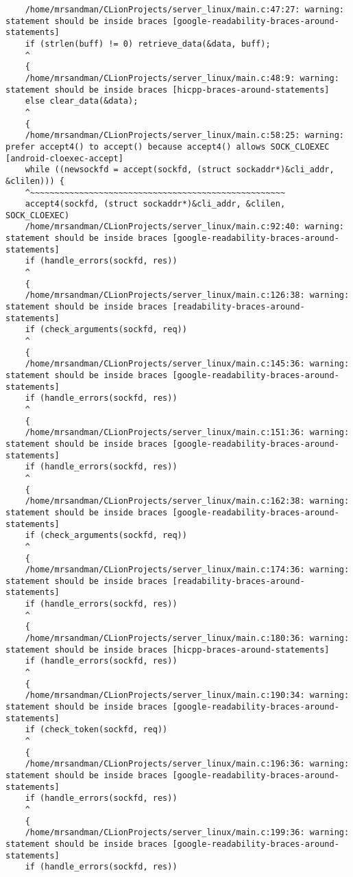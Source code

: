 \begin{itemize}
\begin{lstlisting}
	/home/mrsandman/CLionProjects/server_linux/main.c:47:27: warning: statement should be inside braces [google-readability-braces-around-statements]
	if (strlen(buff) != 0) retrieve_data(&data, buff);
	^
	{
	/home/mrsandman/CLionProjects/server_linux/main.c:48:9: warning: statement should be inside braces [hicpp-braces-around-statements]
	else clear_data(&data);
	^
	{
	/home/mrsandman/CLionProjects/server_linux/main.c:58:25: warning: prefer accept4() to accept() because accept4() allows SOCK_CLOEXEC [android-cloexec-accept]
	while ((newsockfd = accept(sockfd, (struct sockaddr*)&cli_addr, &clilen))) {
	^~~~~~~~~~~~~~~~~~~~~~~~~~~~~~~~~~~~~~~~~~~~~~~~~~~~~
	accept4(sockfd, (struct sockaddr*)&cli_addr, &clilen, SOCK_CLOEXEC)
	/home/mrsandman/CLionProjects/server_linux/main.c:92:40: warning: statement should be inside braces [google-readability-braces-around-statements]
	if (handle_errors(sockfd, res))
	^
	{
	/home/mrsandman/CLionProjects/server_linux/main.c:126:38: warning: statement should be inside braces [readability-braces-around-statements]
	if (check_arguments(sockfd, req))
	^
	{
	/home/mrsandman/CLionProjects/server_linux/main.c:145:36: warning: statement should be inside braces [google-readability-braces-around-statements]
	if (handle_errors(sockfd, res))
	^
	{
	/home/mrsandman/CLionProjects/server_linux/main.c:151:36: warning: statement should be inside braces [google-readability-braces-around-statements]
	if (handle_errors(sockfd, res))
	^
	{
	/home/mrsandman/CLionProjects/server_linux/main.c:162:38: warning: statement should be inside braces [google-readability-braces-around-statements]
	if (check_arguments(sockfd, req))
	^
	{
	/home/mrsandman/CLionProjects/server_linux/main.c:174:36: warning: statement should be inside braces [readability-braces-around-statements]
	if (handle_errors(sockfd, res))
	^
	{
	/home/mrsandman/CLionProjects/server_linux/main.c:180:36: warning: statement should be inside braces [hicpp-braces-around-statements]
	if (handle_errors(sockfd, res))
	^
	{
	/home/mrsandman/CLionProjects/server_linux/main.c:190:34: warning: statement should be inside braces [google-readability-braces-around-statements]
	if (check_token(sockfd, req))
	^
	{
	/home/mrsandman/CLionProjects/server_linux/main.c:196:36: warning: statement should be inside braces [google-readability-braces-around-statements]
	if (handle_errors(sockfd, res))
	^
	{
	/home/mrsandman/CLionProjects/server_linux/main.c:199:36: warning: statement should be inside braces [google-readability-braces-around-statements]
	if (handle_errors(sockfd, res))

\end{lstlisting}
\end{itemize}
